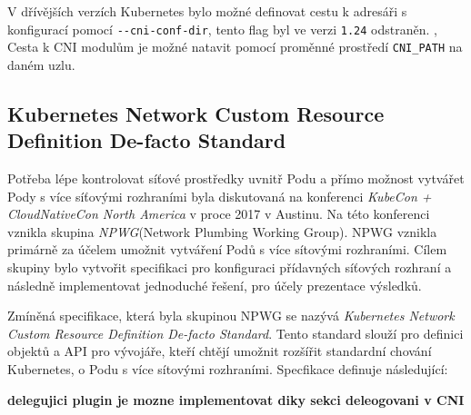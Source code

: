 V dřívějších verzích Kubernetes bylo možné definovat cestu k adresáři s konfigurací pomocí \verb|--cni-conf-dir|, tento flag byl ve verzi \verb|1.24| odstraněn. \cite{k8scirobot_2020_merge} ,\cite{thekubernetesauthors_2022_networkPlugins} Cesta k CNI modulům je možné natavit pomocí proměnné prostředí \verb|CNI_PATH| na daném uzlu.

\subsection{Kubernetes Network Custom Resource Definition De-facto Standard}\label{sec:kncrdds}
Potřeba lépe kontrolovat síťové prostředky uvnitř Podu a přímo možnost vytvářet Pody s více síťovými rozhraními byla diskutovaná na konferenci \textit{KubeCon + CloudNativeCon North America} v proce 2017 v Austinu\cite{woods_2018_a}. Na této konferenci vznikla skupina \textit{NPWG}(Network Plumbing Working Group). NPWG vznikla primárně za účelem umožnit vytváření Podů s více sítovými rozhraními. Cílem skupiny bylo vytvořit specifikaci pro konfiguraci přídavných síťových rozhraní a následně implementovat jednoduché řešení, pro účely prezentace výsledků.

Zmíněná specifikace, která byla skupinou NPWG se nazývá \textit{Kubernetes Network Custom Resource Definition De-facto Standard}. Tento standard slouží pro definici objektů a API pro vývojáře, kteří chtějí umožnit rozšířit standardní chování Kubernetes, o Podu s více sítovými rozhraními. Specfikace definuje následující:

\textbf{delegujici plugin je mozne implementovat diky sekci deleogovani v CNI}

